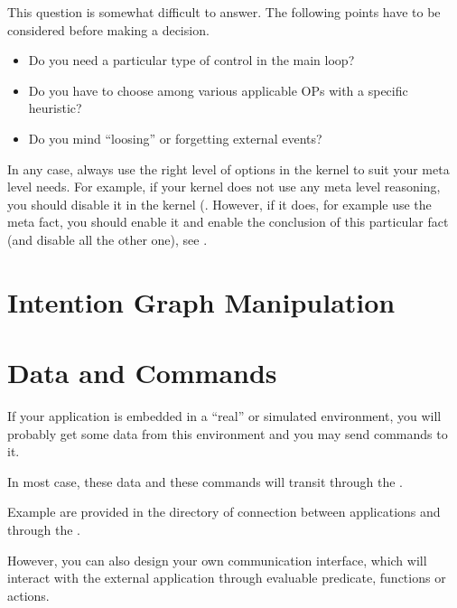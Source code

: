 This question is somewhat difficult to answer. The following points have to
be considered before making a decision.

\begin{itemize}

\item Do you need a particular type of control in the main loop?

\item Do you have to choose among various applicable OPs with a specific
heuristic?

\item Do you mind ``loosing'' or forgetting external events?

\end{itemize}

In any case, always use the right level of options in the kernel to suit
your meta level needs. For example, if your kernel does not use any meta
level reasoning, you should disable it in the kernel (. However, if it does, for example use the  meta
fact, you should enable it and enable the conclusion of this particular
fact (and disable all the other one), see .

\section{Intention Graph Manipulation}


\section{Data and Commands}

If your \OPRS{} application is embedded in a ``real'' or simulated
environment, you will probably get some data from this environment and
you may send commands to it.

In most case, these data and these commands will transit through the
\MP{}.

Example are provided in the  directory of connection between
applications and \CPK{} through the \MP{}.

However, you can also design your own communication interface, which will
interact with the external application through evaluable predicate, functions
or actions.

